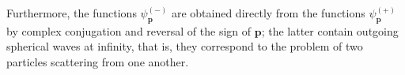 Furthermore, the functions $\psi_{\mathbf p}^{(-)}$ are obtained directly from the functions $\psi_{\mathbf p}^{(+)}$ by complex conjugation and reversal of the sign of $\mathbf p$; the latter contain outgoing spherical waves at infinity, that is, they correspond to the problem of two particles scattering from one another.
